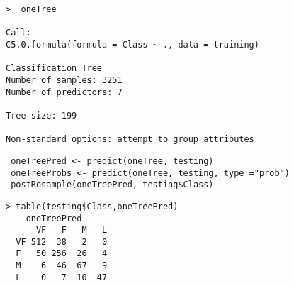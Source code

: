 \documentclass[caret-main.tex]{subfiles}
\begin{document}
\begin{verbatim}
>  oneTree

Call:
C5.0.formula(formula = Class ~ ., data = training)

Classification Tree
Number of samples: 3251 
Number of predictors: 7 

Tree size: 199 

Non-standard options: attempt to group attributes
\end{verbatim}
\newpage
\begin{framed}
\begin{verbatim}
 oneTreePred <- predict(oneTree, testing)
 oneTreeProbs <- predict(oneTree, testing, type ="prob")
 postResample(oneTreePred, testing$Class)
\end{verbatim}
\end{framed}

\begin{verbatim}
> table(testing$Class,oneTreePred)
    oneTreePred
      VF   F   M   L
  VF 512  38   2   0
  F   50 256  26   4
  M    6  46  67   9
  L    0   7  10  47

\end{verbatim}
\end{document}
